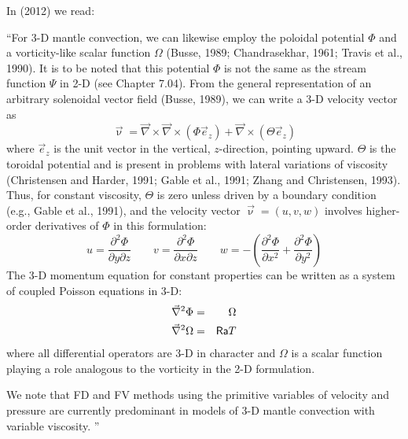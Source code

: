 \noindent In \textcite{zhym12} (2012) we read:
\begin{displayquote}
{\color{darkgray}
``For 3-D mantle convection, we can likewise employ the
poloidal potential $\Phi$ and a vorticity-like scalar function $\Omega$
(Busse, 1989; Chandrasekhar, 1961; Travis et al., 1990). It is
to be noted that this potential $\Phi$ is not the same as the stream
function $\Psi$ in 2-D (see Chapter 7.04). From the general representation 
of an arbitrary solenoidal vector field (Busse, 1989),
we can write a 3-D velocity vector as
\[
\vec\upnu = \vec\nabla \times \vec\nabla \times (\Phi \vec{e}_z) + \vec\nabla \times (\Theta \vec{e}_z)  
\]
where $\vec{e}_z$ is the unit vector in the vertical, $z$-direction, pointing upward.
$\Theta$ is the toroidal potential and is present in problems
with lateral variations of viscosity (Christensen and Harder,
1991; Gable et al., 1991; Zhang and Christensen, 1993).
Thus, for constant viscosity, $\Theta$ is zero unless driven by a
boundary condition (e.g., Gable et al., 1991), and the velocity
vector $\vec\upnu=(u,v,w)$ involves higher-order derivatives of $\Phi$ in this
formulation:
\[
u = \frac{\partial^2 \Phi}{\partial y\partial z}
\qquad
v = \frac{\partial^2 \Phi}{\partial x \partial z}
\qquad
w = - (\frac{\partial^2 \Phi}{\partial x^2} + \frac{\partial^2 \Phi}{\partial y^2})
\]
The 3-D momentum equation for constant properties can
be written as a system of coupled Poisson equations in 3-D:
\begin{eqnarray}
\vec\nabla^2 \Phi &=& \Omega \\
\vec\nabla^2 \Omega &=& {\mathsf{Ra}} T
\end{eqnarray}
where all differential operators are 3-D in character and $\Omega$ is a
scalar function playing a role analogous to the vorticity in the
2-D formulation.

We note that FD and FV methods using the primitive variables 
of velocity and pressure are currently predominant in
models of 3-D mantle convection with variable viscosity.
''}
\end{displayquote}

